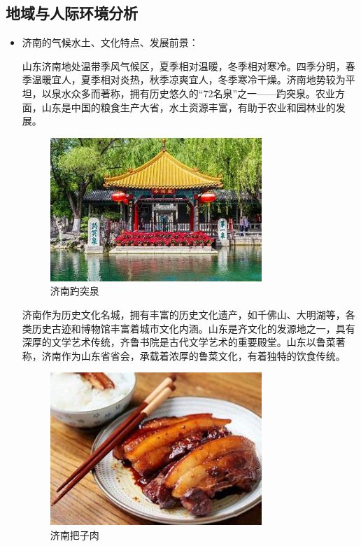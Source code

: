 \documentclass{article}
\begin{document}
\subsection{地域与人际环境分析}
\begin{itemize}
\item 济南的气候水土、文化特点、发展前景：\par
山东济南地处温带季风气候区，夏季相对温暖，冬季相对寒冷。四季分明，春季温暖宜人，夏季相对炎热，秋季凉爽宜人，冬季寒冷干燥。济南地势较为平坦，以泉水众多而著称，拥有历史悠久的“72名泉”之一——趵突泉。农业方面，山东是中国的粮食生产大省，水土资源丰富，有助于农业和园林业的发展。\par

\begin{figure}[h!]
	\centering
	\includegraphics[width=8cm]{baotuquan}
	\caption{济南趵突泉}
	\label{fig:baotuquan}
\end{figure}

济南作为历史文化名城，拥有丰富的历史文化遗产，如千佛山、大明湖等，各类历史古迹和博物馆丰富着城市文化内涵。山东是齐文化的发源地之一，具有深厚的文学艺术传统，齐鲁书院是古代文学艺术的重要殿堂。山东以鲁菜著称，济南作为山东省省会，承载着浓厚的鲁菜文化，有着独特的饮食传统。
\begin{figure}[h!]
	\centering
	\includegraphics[width=8cm]{lucai}
	\caption{济南把子肉}
	\label{fig:lucai}
\end{figure}


\end{itemize}
\end{document}
